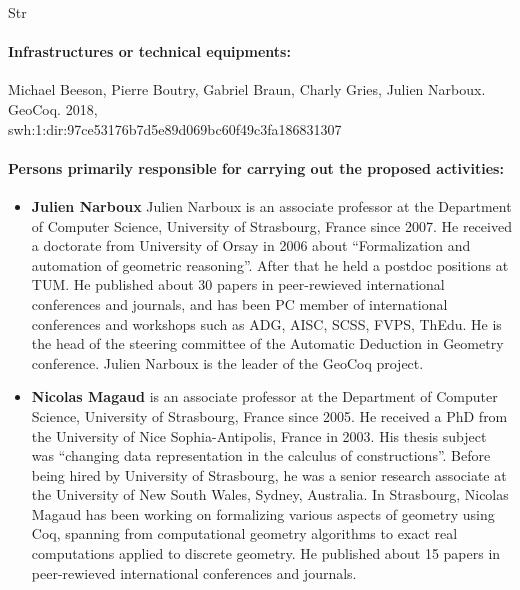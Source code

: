 \begin{sitedescription}{Str}
\paragraph{Infrastructures or technical equipments:}


\begin{compactitem}
\item Michael Beeson, Pierre Boutry, Gabriel Braun, Charly Gries, Julien Narboux. GeoCoq. 2018,\\swh:1:dir:97ce53176b7d5e89d069bc60f49c3fa186831307
\end{compactitem}

\paragraph{Persons primarily responsible for carrying out the proposed activities:}

\begin{itemize}
\item{\bf Julien Narboux}
Julien Narboux is an associate professor at the Department of Computer Science, University of Strasbourg, France since 2007. He received a doctorate from University of Orsay in 2006 about “Formalization and automation of geometric reasoning”. After that he held a postdoc positions at TUM.
He published about 30 papers in peer-rewieved international conferences and journals, and has been PC member of international conferences and workshops such as ADG, AISC, SCSS, FVPS, ThEdu. He is the head of the steering committee of the Automatic Deduction in Geometry conference. Julien Narboux is the leader of the GeoCoq project.

\item{\bf Nicolas Magaud} is an associate professor at the Department of
Computer Science, University of Strasbourg, France since 2005. He
received a PhD from the University of Nice Sophia-Antipolis, France in
2003. His thesis subject was ``changing data representation in the
calculus of constructions''. Before being hired by University of
Strasbourg, he was a senior research associate at the University of
New South Wales, Sydney, Australia. In Strasbourg, Nicolas Magaud
has been working on formalizing various aspects of geometry using Coq, spanning from
computational geometry algorithms to exact real computations applied to
discrete geometry. He published about 15 papers in peer-rewieved
international conferences and journals.  


\end{itemize}
\end{sitedescription}
